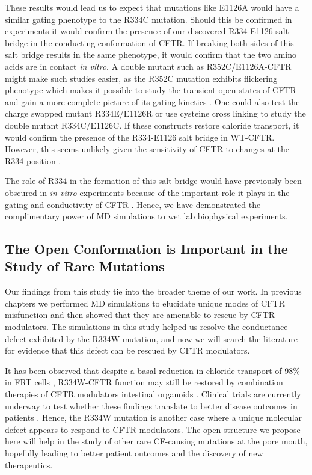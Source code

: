 These results would lead us to expect that mutations like E1126A would have a similar gating phenotype to the R334C mutation. Should this be confirmed in experiments it would confirm the presence of our discovered R334-E1126 salt bridge in the conducting conformation of CFTR. If breaking both sides of this salt bridge results in the same phenotype, it would confirm that the two amino acids are in contact \textit{in vitro}. A double mutant such as R352C/E1126A-CFTR might make such studies easier, as the R352C mutation exhibits flickering phenotype which makes it possible to study the transient open states of CFTR and gain a more complete picture of its gating kinetics \cite{csanady2017, zhang2017b}. One could also test the charge swapped mutant R334E/E1126R or use cysteine cross linking to study the double mutant R334C/E1126C. If these constructs restore chloride transport, it would confirm the presence of the R334-E1126 salt bridge in WT-CFTR. However, this seems unlikely given the sensitivity of CFTR to changes at the R334 position \cite{gong2004}. 

The role of R334 in the formation of this salt bridge would have previously been obscured in \textit{in vitro} experiments because of the important role it plays in the gating and conductivity of CFTR \cite{gong2003, gong2004}. Hence, we have demonstrated the complimentary power of MD simulations to wet lab biophysical experiments. %

\subsection{The Open Conformation is Important in the Study of Rare Mutations}

Our findings from this study tie into the broader theme of our work. In previous chapters we performed MD simulations to elucidate unique modes of CFTR misfunction and then showed that they are amenable to rescue by CFTR modulators. The simulations in this study helped us resolve the conductance defect exhibited by the R334W mutation, and now we will search the literature for evidence that this defect can be rescued by CFTR modulators. 

It has been observed that despite a basal reduction in chloride transport of 98\% in FRT cells \cite{han2018}, R334W-CFTR function may still be restored by combination therapies of CFTR modulators intestinal organoids \cite{vanwilligen2019}. Clinical trials are currently underway to test whether these findings translate to better disease outcomes in patients \cite{R334W_Euro_CF_trial}. Hence, the R334W mutation is another case where a unique molecular defect appears to respond to CFTR modulators. The open structure we propose here will help in the study of other rare CF-causing mutations at the pore mouth, hopefully leading to better patient outcomes and the discovery of new therapeutics.


